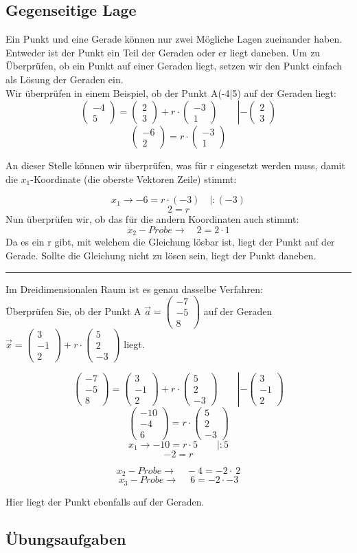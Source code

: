 \documentclass[10pt,a4paper,twoside,fleqn]{article}
\newcommand{\Vektor}[2]{\begin{pmatrix} #1 \\ #2 \end{pmatrix}}
\newcommand{\vektor}[3] {\begin{pmatrix} #1 \\ #2 \\ #3 \end{pmatrix}}
\begin{document}
		\subsection{Gegenseitige Lage}
			Ein Punkt und eine Gerade können nur zwei Mögliche Lagen zueinander haben. Entweder ist der Punkt ein Teil der Geraden oder er liegt daneben. Um zu Überprüfen, ob ein Punkt auf einer Geraden liegt, setzen wir den Punkt einfach als Lösung der Geraden ein.\\
			Wir überprüfen in einem Beispiel, ob der Punkt A(-4|5) auf der Geraden liegt:
			$$\Vektor{-4}{5}=\Vektor{2}{3} + r\cdot\Vektor{-3}{1}\qquad \left|-\Vektor{2}{3}\right.$$
			$$\Vektor{-6}{2} = r \cdot \Vektor{-3}{1} $$
		\medskip	
		
			An dieser Stelle können wir überprüfen, was für r eingesetzt werden muss, damit die $x_1$-Koordinate (die oberste Vektoren Zeile) stimmt:
			
			$$x_1 \rightarrow -6=r\cdot(-3) \quad \left|:(-3)\right. $$
			$$2=r$$
			Nun überprüfen wir, ob das für die andern Koordinaten auch stimmt:
			$$x_2-Probe \rightarrow\quad 2 = 2 \cdot 1 $$ 
			Da es ein r gibt, mit welchem die Gleichung lösbar ist, liegt der Punkt auf der Gerade. Sollte die Gleichung nicht zu lösen sein, liegt der Punkt daneben.\\
		\hrule 
		\bigskip
		Im Dreidimensionalen Raum ist es genau dasselbe Verfahren: \\
		Überprüfen Sie, ob der Punkt A $\vec{a}=\vektor{-7}{-5}{8}$ auf der Geraden $\vec{x}=\vektor{3}{-1}{2} + r \cdot \vektor{5}{2}{-3}$ liegt.\\
	\medskip
		
		$$\vektor{-7}{-5}{8} = \vektor{3}{-1}{2} + r \cdot \vektor{5}{2}{-3} \qquad \left| -\vektor{3}{-1}{2} \right.  $$
		$$\vektor{-10}{-4}{6} = r \cdot \vektor{5}{2}{-3} $$
		$$x_1 \rightarrow -10 = r \cdot 5 \qquad \left| :5 \right.$$
		$$-2 = r$$
		
		$$ x_2-Probe \rightarrow\quad -4 = -2 \cdot ~2$$
		$$ x_3-Probe \rightarrow\quad ~6 = -2 \cdot -3 $$
		
		Hier liegt der Punkt ebenfalls auf der Geraden.
		
		\subsection{Übungsaufgaben}
			
			
\end{document}
